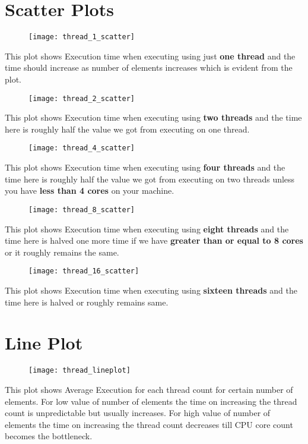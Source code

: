 \documentclass{article}
\let\bold\textbf
\begin{document}
\section*{Scatter Plots}
\begin{figure}[!htb]
    \centering
    \texttt{[image: thread\_1\_scatter]}
    \label{scatter1}
\end{figure}
This plot shows Execution time when executing using just \bold{one thread} and the time should increase as number of elements increases which is evident from the plot.

\newpage
\begin{figure}[!htb]
    \centering
    \texttt{[image: thread\_2\_scatter]}
    \label{scatter2}
\end{figure}
This plot shows Execution time when executing using \bold{two threads} and the time here is roughly half the value we got from executing on one thread.

\newpage
\begin{figure}[!htb]
    \centering
    \texttt{[image: thread\_4\_scatter]}
    \label{scatter4}
\end{figure}
This plot shows Execution time when executing using \bold{four threads} and the time here is roughly half the value we got from executing on two threads unless you have \bold{less than 4 cores} on your machine.

\newpage
\begin{figure}[!htb]
    \centering
    \texttt{[image: thread\_8\_scatter]}
    \label{scatter8}
\end{figure}
This plot shows Execution time when executing using \bold{eight threads} and the time here is halved one more time if we have \bold{greater than or equal to 8 cores} or it roughly remains the same.

\newpage
\begin{figure}[!htb]
    \centering
    \texttt{[image: thread\_16\_scatter]}
    \label{scatter16}
\end{figure}
This plot shows Execution time when executing using \bold{sixteen threads} and the time here is halved or roughly remains same.

\newpage
\section*{Line Plot}
\begin{figure}[!htb]
    \centering
    \texttt{[image: thread\_lineplot]}
    \label{lineplot}
\end{figure}
This plot shows Average Execution for each thread count for certain number of elements. \newline
For low value of number of elements the time on increasing the thread count is unpredictable but usually increases. \newline
For high value of number of elements the time on increasing the thread count decreases till CPU core count becomes the bottleneck.
\end{document}

